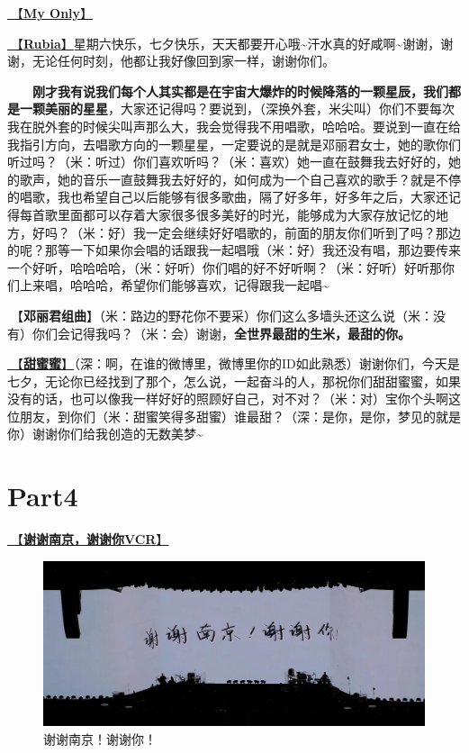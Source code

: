 \documentclass[]{ctexbook}
\begin{document}
\hyperref[my-only]{🎵【\textbf{My Only}】}

\hyperref[rubia]{🎵【\textbf{Rubia}】}星期六快乐，七夕快乐，天天都要开心哦\textasciitilde 汗水真的好咸啊\textasciitilde 谢谢，谢谢，无论任何时刻，他都让我好像回到家一样，谢谢你们。

  \textbf{刚才我有说我们每个人其实都是在宇宙大爆炸的时候降落的一颗星辰，我们都是一颗美丽的星星}，大家还记得吗？要说到，（深换外套，米尖叫）你们不要每次我在脱外套的时候尖叫声那么大，我会觉得我不用唱歌，哈哈哈。要说到一直在给我指引方向，去唱歌方向的一颗星星，一定要说的是就是邓丽君女士，她的歌你们听过吗？（米：听过）你们喜欢听吗？（米：喜欢）她一直在鼓舞我去好好的，她的歌声，她的音乐一直鼓舞我去好好的，如何成为一个自己喜欢的歌手？就是不停的唱歌，我也希望自己以后能够有很多歌曲，隔了好多年，好多年之后，大家还记得每首歌里面都可以存着大家很多很多美好的时光，能够成为大家存放记忆的地方，好吗？（米：好）我一定会继续好好唱歌的，前面的朋友你们听到了吗？那边的呢？那等一下如果你会唱的话跟我一起唱哦（米：好）我还没有唱，那边要传来一个好听，哈哈哈哈，（米：好听）你们唱的好不好听啊？（米：好听）好听那你们上来唱，哈哈哈，希望你们能够喜欢，记得跟我一起唱\textasciitilde{}

🎵【\textbf{邓丽君组曲}】（米：路边的野花你不要采）你们这么多墙头还这么说（米：没有）你们会记得我吗？（米：会）谢谢，\textbf{全世界最甜的生米，最甜的你。}

\hyperref[sweet]{🎵【\textbf{甜蜜蜜}】}（深：啊，在谁的微博里，微博里你的ID如此熟悉）谢谢你们，今天是七夕，无论你已经找到了那个，怎么说，一起奋斗的人，那祝你们甜甜蜜蜜，如果没有的话，也可以像我一样好好的照顾好自己，对不对？（米：对）宝你个头啊这位朋友，到你们（米：甜蜜笑得多甜蜜）谁最甜？（深：是你，是你，梦见的就是你）谢谢你们给我创造的无数美梦\textasciitilde{}

\newpage

\section{Part4}\label{nanjing-20240810-part4}

\hyperref[thank-you-vcr]{🎥【\textbf{谢谢南京，谢谢你VCR}】}

\begin{figure}

{\centering \includegraphics[width=400pt]{img/nanjing20240810/thank-nanjing} 

}

\caption{谢谢南京！谢谢你！}\label{fig:unnamed-chunk-73}
\end{figure}
\end{document}
